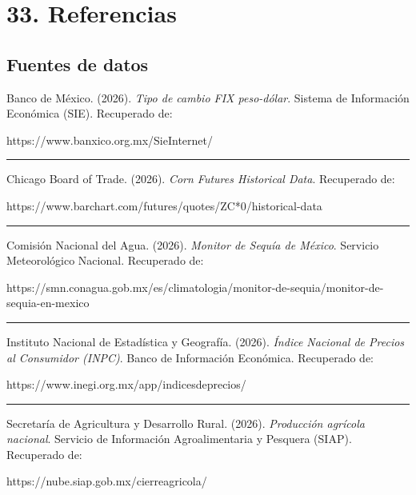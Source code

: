 \documentclass[11pt]{article}
\begin{document}
    \hypertarget{referencias}{%
\section{33. Referencias}\label{referencias}}

\hypertarget{fuentes-de-datos}{%
\subsection{Fuentes de datos}\label{fuentes-de-datos}}

Banco de México. (2026). \emph{Tipo de cambio FIX peso-dólar}. Sistema
de Información Económica (SIE). Recuperado de:

https://www.banxico.org.mx/SieInternet/

\begin{center}\rule{0.5\linewidth}{0.5pt}\end{center}

Chicago Board of Trade. (2026). \emph{Corn Futures Historical Data}.
Recuperado de:

https://www.barchart.com/futures/quotes/ZC*0/historical-data

\begin{center}\rule{0.5\linewidth}{0.5pt}\end{center}

Comisión Nacional del Agua. (2026). \emph{Monitor de Sequía de México}.
Servicio Meteorológico Nacional. Recuperado de:

https://smn.conagua.gob.mx/es/climatologia/monitor-de-sequia/monitor-de-sequia-en-mexico

\begin{center}\rule{0.5\linewidth}{0.5pt}\end{center}

Instituto Nacional de Estadística y Geografía. (2026). \emph{Índice
Nacional de Precios al Consumidor (INPC)}. Banco de Información
Económica. Recuperado de:

https://www.inegi.org.mx/app/indicesdeprecios/

\begin{center}\rule{0.5\linewidth}{0.5pt}\end{center}

Secretaría de Agricultura y Desarrollo Rural. (2026). \emph{Producción
agrícola nacional}. Servicio de Información Agroalimentaria y Pesquera
(SIAP). Recuperado de:

https://nube.siap.gob.mx/cierreagricola/
\end{document}
